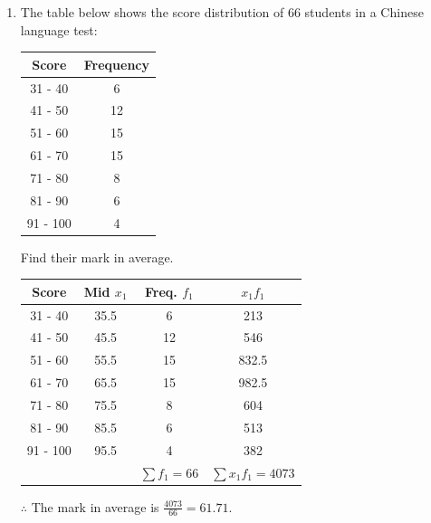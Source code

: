 \documentclass{report}
\begin{document}
\begin{multicols}{2}
\begin{enumerate}
    \item The table below shows the score distribution of 66 students in a Chinese
          language test:
          \begin{center}
            \begin{tabular}{|c|c|}
              \hline
              Score    & Frequency \\
              \hline
              31 - 40  & 6         \\
              41 - 50  & 12        \\
              51 - 60  & 15        \\
              61 - 70  & 15        \\
              71 - 80  & 8         \\
              81 - 90  & 6         \\
              91 - 100 & 4         \\
              \hline
            \end{tabular}
          \end{center}
          Find their mark in average.
          \begin{center}
            \begin{tabular}{|c|c|c|c|}
              \hline
              Score    & Mid $x_1$ & Freq. $f_1$     & $x_1f_1$             \\
              \hline
              31 - 40  & 35.5      & 6               & 213                  \\
              41 - 50  & 45.5      & 12              & 546                  \\
              51 - 60  & 55.5      & 15              & 832.5                \\
              61 - 70  & 65.5      & 15              & 982.5                \\
              71 - 80  & 75.5      & 8               & 604                  \\
              81 - 90  & 85.5      & 6               & 513                  \\
              91 - 100 & 95.5      & 4               & 382                  \\
              \hline
                       &           & $\sum f_1 = 66$ & $\sum x_1f_1 = 4073$ \\
              \hline
            \end{tabular}
          \end{center}
          $\therefore$ The mark in average is $\frac{4073}{66} = 61.71$.


\end{enumerate}
\end{multicols}
\end{document}

